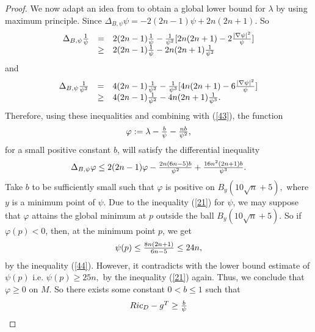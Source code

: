 \documentclass[12pt]{amsart}%
\numberwithin{equation}{section}
\begin{document}
\begin{proof}
We now adapt an idea from \cite{cly} to obtain a global lower bound for
$\lambda$ by using maximum principle. Since $\Delta_{B,\psi}\psi
=-2(2n-1)\psi+2n(2n+1).$ So
\[%
\begin{array}
[c]{lll}%
\Delta_{B,\psi}\frac{1}{\psi} & = & 2(2n-1)\frac{1}{\psi}-\frac{1}{\psi^{2}%
}[2n(2n+1)-2\frac{\left\vert \nabla\psi\right\vert ^{2}}{\psi}]\\
& \geq & 2(2n-1)\frac{1}{\psi}-2n(2n+1)\frac{1}{\psi^{2}}%
\end{array}
\]
and
\[%
\begin{array}
[c]{lll}%
\Delta_{B,\psi}\frac{1}{\psi^{2}} & = & 4(2n-1)\frac{1}{\psi^{2}}-\frac
{1}{\psi^{3}}[4n(2n+1)-6\frac{\left\vert \nabla\psi\right\vert ^{2}}{\psi}]\\
& \geq & 4(2n-1)\frac{1}{\psi^{2}}-4n(2n+1)\frac{1}{\psi^{3}}.
\end{array}
\]
Therefore, using these inequalities and combining with (\ref{43}), the
function%
\[%
\begin{array}
[c]{c}%
\varphi:=\lambda-\frac{b}{\psi}-\frac{nb}{\psi^{2}},
\end{array}
\]
for a small positive constant $b$, will satisfy the differential inequality
\begin{equation}%
\begin{array}
[c]{l}%
\Delta_{B,\psi}\varphi\leq2(2n-1)\varphi-\frac{2n(6n-5)b}{\psi^{2}}%
+\frac{16n^{2}(2n+1)b}{\psi^{3}}.
\end{array}
\label{44}%
\end{equation}
Take $b$ to be sufficiently small such that $\varphi$ is positive on
$B_{y}(10\sqrt{n}+5),$ where $y$ is a minimum point of $\psi$. Due to the
inequality (\ref{21}) for $\psi$, we may suppose that $\varphi$ attains the
global minimum at $p$ outside the ball $B_{y}(10\sqrt{n}+5)$. So if
$\varphi(p)<0$, then, at the minimum point $p$, we get
\[%
\begin{array}
[c]{l}%
\psi(p)\leq\frac{8n(2n+1)}{6n-5}\leq24n,
\end{array}
\]
by the inequality (\ref{44}). However, it contradicts with the lower bound
estimate of $\psi(p)$ i.e. $\psi(p)\geq25n,$ by the inequality (\ref{21})
again. Thus, we conclude that $\varphi\geq0$ on $M$. So there exists some
constant $0<b\leq1$ such that%
\begin{equation}%
\begin{array}
[c]{c}%
Ric_{D}-g^{T}\geq\frac{b}{\psi}%
\end{array}
\label{45}%
\end{equation}

\end{proof}
\end{document}
